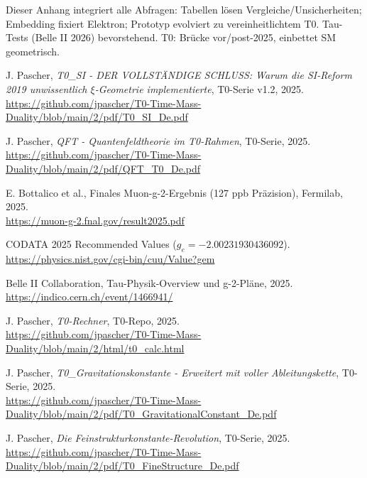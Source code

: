 \documentclass[12pt,a4paper]{article}
\begin{document}
	Dieser Anhang integriert alle Abfragen: Tabellen lösen Vergleiche/Unsicherheiten; Embedding fixiert Elektron; Prototyp evolviert zu vereinheitlichtem T0. Tau-Tests (Belle II 2026) bevorstehend. T0: Brücke vor/post-2025, einbettet SM geometrisch.
	
	
	\begin{thebibliography}{99}
		 J. Pascher, \textit{T0\_SI - DER VOLLSTÄNDIGE SCHLUSS: Warum die SI-Reform 2019 unwissentlich $\xi$-Geometrie implementierte}, T0-Serie v1.2, 2025. \\
		\url{https://github.com/jpascher/T0-Time-Mass-Duality/blob/main/2/pdf/T0_SI_De.pdf}
		
		 J. Pascher, \textit{QFT - Quantenfeldtheorie im T0-Rahmen}, T0-Serie, 2025. \\
		\url{https://github.com/jpascher/T0-Time-Mass-Duality/blob/main/2/pdf/QFT_T0_De.pdf}
		
		 E. Bottalico et al., Finales Muon-g-2-Ergebnis (127 ppb Präzision), Fermilab, 2025. \\
		\url{https://muon-g-2.fnal.gov/result2025.pdf}
		
		 CODATA 2025 Recommended Values ($g_e = -2.00231930436092$). \\
		\url{https://physics.nist.gov/cgi-bin/cuu/Value?gem}
		
		 Belle II Collaboration, Tau-Physik-Overview und g-2-Pläne, 2025. \\
		\url{https://indico.cern.ch/event/1466941/}
		
		 J. Pascher, \textit{T0-Rechner}, T0-Repo, 2025. \\
		\url{https://github.com/jpascher/T0-Time-Mass-Duality/blob/main/2/html/t0_calc.html}
		
		 J. Pascher, \textit{T0\_Gravitationskonstante - Erweitert mit voller Ableitungskette}, T0-Serie, 2025. \\
		\url{https://github.com/jpascher/T0-Time-Mass-Duality/blob/main/2/pdf/T0_GravitationalConstant_De.pdf}
		
		 J. Pascher, \textit{Die Feinstrukturkonstante-Revolution}, T0-Serie, 2025. \\
		\url{https://github.com/jpascher/T0-Time-Mass-Duality/blob/main/2/pdf/T0_FineStructure_De.pdf}
		

\end{thebibliography}
\end{document}
